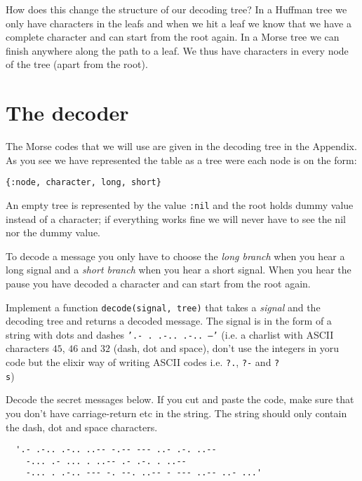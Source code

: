 \documentclass[a4paper,11pt]{article}
\begin{document}
How does this change the structure of our decoding tree? In a Huffman
tree we only have characters in the leafs and when we hit a leaf we
know that we have a complete character and can start from the root
again. In a Morse tree we can finish anywhere along the path to a
leaf. We thus have characters in every node of the tree (apart from the
root).



\section{The decoder}

The Morse codes that we will use are given in the decoding tree in
the Appendix. As you see we have represented the table as a tree were
each node is on the form:

\begin{verbatim}
{:node, character, long, short}
\end{verbatim}

An empty tree is represented by the value {\tt :nil} and the root holds
dummy value instead of a character; if everything works fine we
will never have to see the nil nor the dummy value.

To decode a message you only have to choose the {\em long branch} when you
hear a long signal and a {\em short branch} when you hear a short
signal. When you hear the pause you have decoded a character and can
start from the root again. 

Implement a function {\tt decode(signal, tree)} that takes a {\em
  signal} and the decoding tree and returns a decoded message. The
signal is in the form of a string with dots and dashes {\tt '.-
  . .-.. .-.. ---'} (i.e. a charlist with ASCII characters $45$, $46$
and $32$ (dash, dot and space), don't use the integers in yoru code
but the elixir way of writing ASCII codes i.e. {\tt ?.}, {\tt ?-} and
{\tt ?\\s})

Decode the secret messages below. If you cut and paste the code, make
sure that you don't have carriage-return etc in the string. The string
should only contain the dash, dot and space characters. 

\begin{verbatim}
  '.- .-.. .-.. ..-- -.-- --- ..- .-. ..-- 
    -... .- ... . ..-- .- .-. . ..-- 
    -... . .-.. --- -. --. ..-- - --- ..-- ..- ...'
\end{verbatim}
\end{document}
